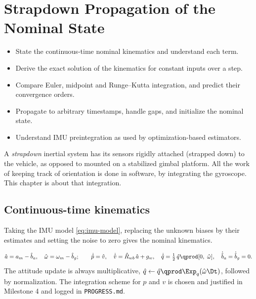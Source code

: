 \chapter{Strapdown Propagation of the Nominal State}
\label{ch:strapdown}

\begin{objectives}
\begin{itemize}
  \item State the continuous-time nominal kinematics and understand each term.
  \item Derive the exact solution of the kinematics for constant inputs over a step.
  \item Compare Euler, midpoint and Runge--Kutta integration, and predict their convergence orders.
  \item Propagate to arbitrary timestamps, handle gaps, and initialize the nominal state.
  \item Understand IMU preintegration as used by optimization-based estimators.
\end{itemize}
\end{objectives}

A \emph{strapdown} inertial system has its sensors rigidly attached (strapped down) to the vehicle, as
opposed to mounted on a stabilized gimbal platform. All the work of keeping track of orientation is done in
software, by integrating the gyroscope. This chapter is about that integration.

\section{Continuous-time kinematics}

Taking the IMU model \eqref{eq:imu-model}, replacing the unknown biases by their estimates and setting the noise
to zero gives the nominal kinematics.

\begin{convention}
\begin{equation}
  \hat a = a_m - \hat b_a,\quad \hat\omega = \omega_m - \hat b_g;\qquad
  \dot{\hat p} = \hat v,\quad \dot{\hat v} = \hat R_{wb}\,\hat a + g_w,\quad
  \dot{\hat q} = \tfrac12\,\hat q\qprod[0,\ \hat\omega],\quad \dot{\hat b}_a = \dot{\hat b}_g = 0 .
  \label{eq:nominal-ct}
\end{equation}
The attitude update is always multiplicative, $\hat q \gets \hat q\qprod\Exp_q(\hat\omega\Dt)$, followed by
normalization. The integration scheme for $p$ and $v$ is chosen and justified in Milestone 4 and logged
in \texttt{PROGRESS.md}.
\end{convention}

